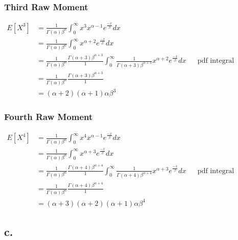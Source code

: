 \documentclass[12pt]{article}
\begin{document}
\subsubsection*{Third Raw Moment}
\begin{align*}
        E[X^3] &= \frac{1}{\Gamma(\alpha)\beta^\alpha} 
          \int_0^\infty x^3 x^{\alpha-1} e^{\frac{-x}{\beta}}dx \\
        &= \frac{1}{\Gamma(\alpha)\beta^\alpha} 
          \int_0^\infty x^{\alpha+2} e^{\frac{-x}{\beta}}dx \\
        &= \frac{1}{\Gamma(\alpha)\beta^\alpha} \frac{\Gamma(\alpha+3)\beta^{\alpha+3}}{1} 
          \int_0^\infty \frac{1}{\Gamma(\alpha+3)\beta^{\alpha+3}} x^{\alpha+2} e^{\frac{-x}{\beta}}dx & &
          \textrm{pdf integral evaluates to 1}\\
        &= \frac{1}{\Gamma(\alpha)\beta^\alpha} \frac{\Gamma(\alpha+3)\beta^{\alpha+3}}{1} \\
        &= (\alpha + 2)(\alpha + 1)\alpha \beta^3
\end{align*}

\subsubsection*{Fourth Raw Moment}
\begin{align*}
        E[X^4] &= \frac{1}{\Gamma(\alpha)\beta^\alpha} 
          \int_0^\infty x^4 x^{\alpha-1} e^{\frac{-x}{\beta}}dx \\
        &= \frac{1}{\Gamma(\alpha)\beta^\alpha} 
          \int_0^\infty x^{\alpha+3} e^{\frac{-x}{\beta}}dx \\
        &= \frac{1}{\Gamma(\alpha)\beta^\alpha} \frac{\Gamma(\alpha+4)\beta^{\alpha+4}}{1} 
          \int_0^\infty \frac{1}{\Gamma(\alpha+4)\beta^{\alpha+4}} x^{\alpha+3} e^{\frac{-x}{\beta}}dx & &
          \textrm{pdf integral evaluates to 1}\\
        &= \frac{1}{\Gamma(\alpha)\beta^\alpha} \frac{\Gamma(\alpha+4)\beta^{\alpha+4}}{1} \\
        &= (\alpha + 3)(\alpha + 2)(\alpha + 1)\alpha \beta^4
\end{align*}

\subsection*{c.}
\end{document}
